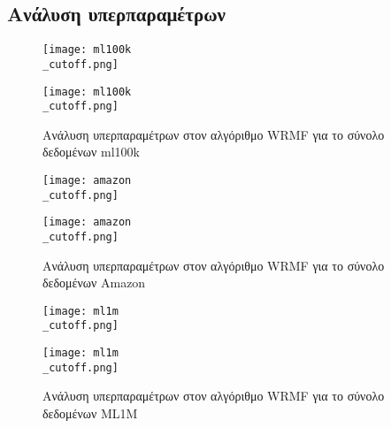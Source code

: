 \begin{appendices}
\section{Ανάλυση υπερπαραμέτρων}
\vspace{-9.00mm}
\begin{figure}[H]
	\centering
	\texttt{[image: ml100k\\\_cutoff.png]}
	\vspace*{-5mm}
	\label{fig:ml100k_cutoff}
\end{figure}
\begin{figure}[H]
	\centering
	\texttt{[image: ml100k\\\_cutoff.png]}
	\vspace*{-5mm}
	\caption{Ανάλυση υπερπαραμέτρων στον αλγόριθμο WRMF για το σύνολο δεδομένων ml100k}
	\label{fig:ml100k_cutoff1}
\end{figure}
\begin{figure}[H]
	\centering
	\texttt{[image: amazon\\\_cutoff.png]}
	\label{fig:amazon_cutoff}
\end{figure}
\begin{figure}[H]
	\centering
	\texttt{[image: amazon\\\_cutoff.png]}
	\caption{Ανάλυση υπερπαραμέτρων στον αλγόριθμο WRMF για το σύνολο δεδομένων Amazon}
	\label{fig:amazon_cutoff1}
\end{figure}
\begin{figure}[H]
	\centering
	\texttt{[image: ml1m\\\_cutoff.png]}
	\label{fig:ml1m_cutoff}
\end{figure}
\begin{figure}[H]
	\centering
	\texttt{[image: ml1m\\\_cutoff.png]}
	\caption{Ανάλυση υπερπαραμέτρων στον αλγόριθμο WRMF για το σύνολο δεδομένων ML1M}
	\label{fig:ml1m_cutoff1}
\end{figure}
\end{appendices}
